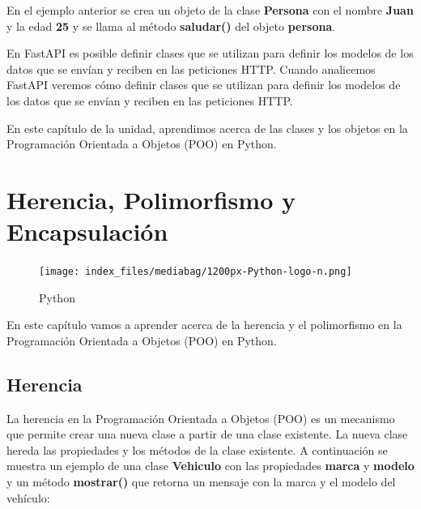 \documentclass[
  a4paper,
  DIV=11,
  numbers=noendperiod,
  onepage,
  openany]{scrreprt}
\begin{document}
En el ejemplo anterior se crea un objeto de la clase \textbf{Persona}
con el nombre \textbf{Juan} y la edad \textbf{25} y se llama al método
\textbf{saludar()} del objeto \textbf{persona}.

En FastAPI es posible definir clases que se utilizan para definir los
modelos de los datos que se envían y reciben en las peticiones HTTP.
Cuando analicemos FastAPI veremos cómo definir clases que se utilizan
para definir los modelos de los datos que se envían y reciben en las
peticiones HTTP.

En este capítulo de la unidad, aprendimos acerca de las clases y los
objetos en la Programación Orientada a Objetos (POO) en Python.

\chapter{Herencia, Polimorfismo y
Encapsulación}\label{herencia-polimorfismo-y-encapsulaciuxf3n}

\begin{figure}[H]

{\centering \texttt{[image: index\_files/mediabag/1200px-Python-logo-n.png]}

}

\caption{Python}

\end{figure}%

En este capítulo vamos a aprender acerca de la herencia y el
polimorfismo en la Programación Orientada a Objetos (POO) en Python.

\section{Herencia}\label{herencia}

La herencia en la Programación Orientada a Objetos (POO) es un mecanismo
que permite crear una nueva clase a partir de una clase existente. La
nueva clase hereda las propiedades y los métodos de la clase existente.
A continuación se muestra un ejemplo de una clase \textbf{Vehiculo} con
las propiedades \textbf{marca} y \textbf{modelo} y un método
\textbf{mostrar()} que retorna un mensaje con la marca y el modelo del
vehículo:
\end{document}
